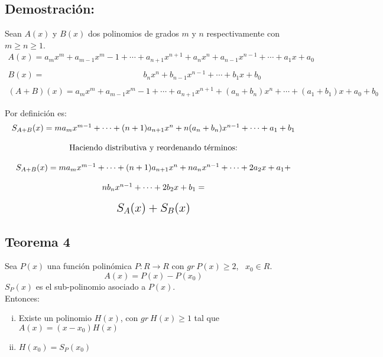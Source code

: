 \documentclass[12pt]{article}
\begin{document}
\subsection*{Demostración:}
Sean $A(x)$ y $B(x)$ dos polinomios de grados $m$ y $n$ respectivamente con $m \geqslant n \geqslant 1$.
$$
  \begin{array}{ccc}
    A(x)={a}_m x^m + {a}_{m-1}x^m-1 + \cdots + {a}_{n+1} x^{n+1} + {a}_n x^n + {a}_{n-1} x^{n-1} + \cdots + {a}_1 x + {a}_0                                                    \\
    \\
    B(x)= \ \ \ \ \ \ \ \ \ \ \ \ \ \ \ \ \ \ \ \ \ \ \ \ \ \ \ \ \ \ \ \ \ \ \ \ \ \ \ \ \ \ \ \ \ \ \ \ \ \ \ \ \ \ {b}_n x^n + {b}_{n-1} x^{n-1} + \cdots + {b}_1 x + {b}_0 \\
    \\
    (A+B)(x)={a}_m x^m + {a}_{m-1}x^m-1 + \cdots + {a}_{n+1} x^{n+1} + ({a}_n+{b}_n) x^n +\cdots+ ({a}_1+{b}_1)x+{a}_0+{b}_0
  \end{array}
$$

Por definición es:
$$
  \begin{array}{ccc}
    {S}_{A+B}(x)=m{a}_m x^{m-1}+\cdots+(n+1){a}_{n+1} x^n + n({a}_n+{b}_n)x^{n-1} +\cdots+ {a}_1+{b}_1 \\
    \\
    \text{Haciendo distributiva y reordenando términos:}                                               \\
    \\
    {S}_{A+B}(x)=m{a}_m x^{m-1}+\cdots+(n+1){a}_{n+1} x^n + n{a}_n x^{n-1}+\cdots+2{a}_2 x+{a}_1+      \\
    \\
    n{b}_n x^{n-1}+\cdots+2{b}_2 x+{b}_1=                                                              \\
    \\
    \text{\Large ${S}_A (x) + {S}_B (x)$}
  \end{array}
$$




\subsection{
  Teorema 4
}
Sea $P(x)$ una función polinómica $P:R \rightarrow R$ con $gr \ P(x) \geqslant 2$, \ ${x}_0 \in R$.
$$
  A(x)=P(x)-P({x}_0)
$$
${S}_P(x)$ es el sub-polinomio asociado a $P(x)$. \\
Entonces:
\begin{enumerate}[i)]
  \item Existe un polinomio $H(x)$, con $gr \ H(x) \geqslant 1$ tal que $A(x)=(x-{x}_0)H(x)$

  \item $H({x}_0)={S}_P({x}_0)$
\end{enumerate}
\end{document}
